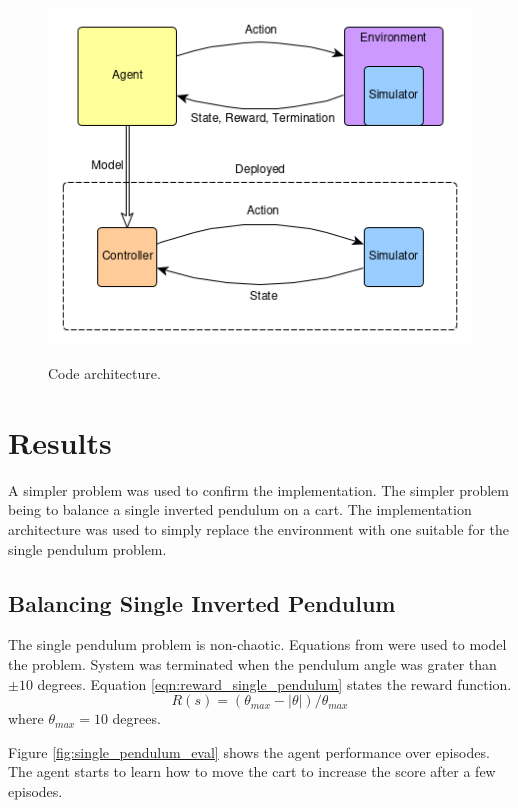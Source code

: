 \documentclass{LTHtwocol} %
\begin{document}
\begin{figure}[H]
	\centering
	\includegraphics[width=0.9\columnwidth]{figures/CodeStructure.png}
	\label{fig:code_architecture}
	\caption{Code architecture.}
\end{figure}

\section{Results}
A simpler problem was used to confirm the implementation.
The simpler problem being to balance a single inverted pendulum on a cart.
The implementation architecture was used to simply replace the environment with one suitable for the single pendulum problem.

\subsection{Balancing Single Inverted Pendulum}
The single pendulum problem is non-chaotic.
Equations from \cite{Correct_Equations} were used to model the problem.
System was terminated when the pendulum angle was grater than $\pm 10$ degrees.
Equation \eqref{eqn:reward_single_pendulum} states the reward function.
\begin{equation}
	\label{eqn:reward_single_pendulum}
	R(s) = (\theta_{max} -  |\theta|)/ \theta_{max}
\end{equation}
where $\theta_{max} = 10$ degrees.

Figure \ref{fig:single_pendulum_eval} shows the agent performance over episodes.
The agent starts to learn how to move the cart to increase the score after a few episodes.
\end{document}
